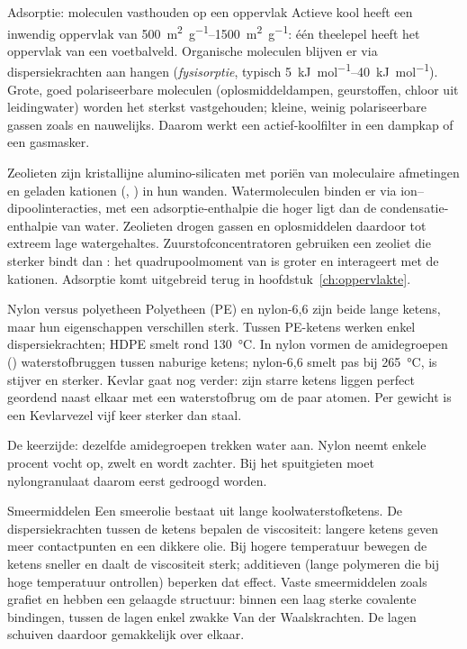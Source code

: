 \begin{toepassing}{Adsorptie: moleculen vasthouden op een oppervlak}
Actieve kool heeft een inwendig oppervlak van \SIrange{500}{1500}{\square\metre\per\gram}: \'e\'en theelepel heeft het oppervlak van een voetbalveld. Organische moleculen blijven er via dispersiekrachten aan hangen (\emph{fysisorptie}, typisch \SIrange{5}{40}{\kilo\joule\per\mole}). Grote, goed polariseerbare moleculen (oplosmiddeldampen, geurstoffen, chloor uit leidingwater) worden het sterkst vastgehouden; kleine, weinig polariseerbare gassen zoals  en  nauwelijks. Daarom werkt een actief-koolfilter in een dampkap of een gasmasker.

Zeolieten zijn kristallijne alumino-silicaten met pori\"en van moleculaire afmetingen en geladen kationen (, ) in hun wanden. Watermoleculen binden er via ion--dipoolinteracties, met een adsorptie-enthalpie die hoger ligt dan de condensatie-enthalpie van water. Zeolieten drogen gassen en oplosmiddelen daardoor tot extreem lage watergehaltes. Zuurstofconcentratoren gebruiken een zeoliet die  sterker bindt dan : het quadrupoolmoment van  is groter en interageert met de kationen. Adsorptie komt uitgebreid terug in hoofdstuk~\ref{ch:oppervlakte}.
\end{toepassing}

\begin{toepassing}{Nylon versus polyetheen}
Polyetheen (PE) en nylon-6,6 zijn beide lange ketens, maar hun eigenschappen verschillen sterk. Tussen PE-ketens werken enkel dispersiekrachten; HDPE smelt rond \SI{130}{\celsius}. In nylon vormen de amidegroepen () waterstofbruggen tussen naburige ketens; nylon-6,6 smelt pas bij \SI{265}{\celsius}, is stijver en sterker. Kevlar gaat nog verder: zijn starre ketens liggen perfect geordend naast elkaar met een waterstofbrug om de paar atomen. Per gewicht is een Kevlarvezel vijf keer sterker dan staal.

De keerzijde: dezelfde amidegroepen trekken water aan. Nylon neemt enkele procent vocht op, zwelt en wordt zachter. Bij het spuitgieten moet nylongranulaat daarom eerst gedroogd worden.
\end{toepassing}

\begin{toepassing}{Smeermiddelen}
Een smeerolie bestaat uit lange koolwaterstofketens. De dispersiekrachten tussen de ketens bepalen de viscositeit: langere ketens geven meer contactpunten en een dikkere olie. Bij hogere temperatuur bewegen de ketens sneller en daalt de viscositeit sterk; additieven (lange polymeren die bij hoge temperatuur ontrollen) beperken dat effect. Vaste smeermiddelen zoals grafiet en  hebben een gelaagde structuur: binnen een laag sterke covalente bindingen, tussen de lagen enkel zwakke Van der Waalskrachten. De lagen schuiven daardoor gemakkelijk over elkaar.
\end{toepassing}

